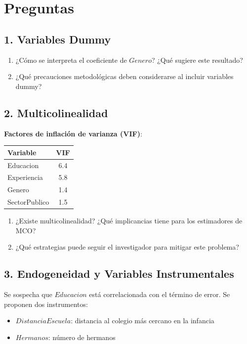 \documentclass[12pt]{article}
\begin{document}
\section*{Preguntas}

\subsection*{1. Variables Dummy}
\begin{enumerate}
  \item[a)] ¿Cómo se interpreta el coeficiente de $Genero$? ¿Qué sugiere este resultado?
  \item[b)] ¿Qué precauciones metodológicas deben considerarse al incluir variables dummy?
\end{enumerate}

\subsection*{2. Multicolinealidad}

\textbf{Factores de inflación de varianza (VIF)}:

\begin{center}
\begin{tabular}{lc}
\toprule
Variable & VIF \\
\midrule
Educacion       & 6.4 \\
Experiencia     & 5.8 \\
Genero          & 1.4 \\
SectorPublico   & 1.5 \\
\bottomrule
\end{tabular}
\end{center}

\begin{enumerate}
  \item[a)] ¿Existe multicolinealidad? ¿Qué implicancias tiene para los estimadores de MCO?
  \item[b)] ¿Qué estrategias puede seguir el investigador para mitigar este problema?
\end{enumerate}

\subsection*{3. Endogeneidad y Variables Instrumentales}

Se sospecha que $Educacion$ está correlacionada con el término de error. Se proponen dos instrumentos:
\begin{itemize}
  \item $DistanciaEscuela$: distancia al colegio más cercano en la infancia
  \item $Hermanos$: número de hermanos
\end{itemize}
\end{document}
